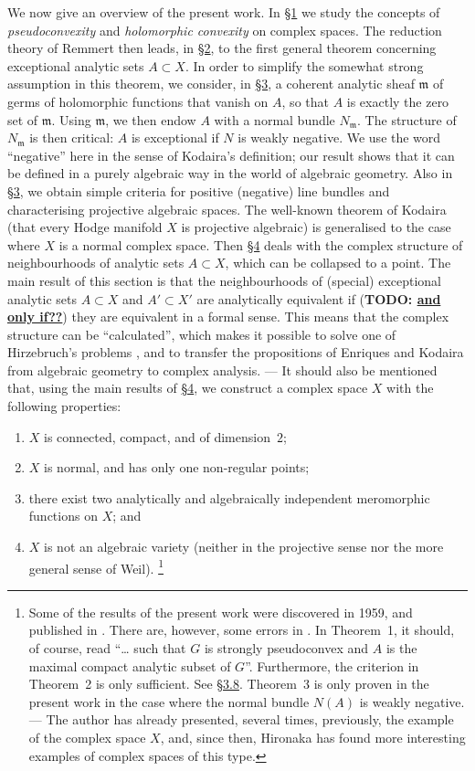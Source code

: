 \documentclass{article}
\theoremstyle{plain}
\theoremstyle{definition}
\newcommand{\fk}{\mathfrak}
\newcommand{\unsure}[1]{\textbf{TODO: \underline{#1}}}
\newcommand{\oldpage}[1]{\marginpar{\footnotesize$\Big\vert$ \textit{p.~#1}}}
\begin{document}
\oldpage{332}
We now give an overview of the present work.
In \hyperref[1]{\S1} we study the concepts of \emph{pseudoconvexity} and \emph{holomorphic convexity} on complex spaces.
The reduction theory of Remmert then leads, in \hyperref[2]{\S2}, to the first general theorem concerning exceptional analytic sets $A\subset X$.
In order to simplify the somewhat strong assumption in this theorem, we consider, in \hyperref[3]{\S3}, a coherent analytic sheaf $\fk{m}$ of germs of holomorphic functions that vanish on $A$, so that $A$ is exactly the zero set of $\fk{m}$.
Using $\fk{m}$, we then endow $A$ with a normal bundle $N_\fk{m}$.
The structure of $N_\fk{m}$ is then critical: $A$ is exceptional if $N$ is weakly negative.
We use the word ``negative'' here in the sense of Kodaira's definition; our result shows that it can be defined in a purely algebraic way in the world of algebraic geometry.
Also in \hyperref[3]{\S3}, we obtain simple criteria for positive (negative) line bundles and characterising projective algebraic spaces.
The well-known theorem of Kodaira (that every Hodge manifold $X$ is projective algebraic) is generalised to the case where $X$ is a normal complex space.
Then \hyperref[4]{\S4} deals with the complex structure of neighbourhoods of analytic sets $A\subset X$, which can be collapsed to a point.
The main result of this section is that the neighbourhoods of (special) exceptional analytic sets $A\subset X$ and $A'\subset X'$ are analytically equivalent if (\unsure{and only if??}) they are equivalent in a formal sense.
This means that the complex structure can be ``calculated'', which makes it possible to solve one of Hirzebruch's problems \cite{11}, and to transfer the propositions of Enriques and Kodaira from algebraic geometry to complex analysis.
--- It should also be mentioned that, using the main results of \hyperref[4]{\S4}, we construct a complex space $X$ with the following properties:
\begin{enumerate}[1)]
  \item $X$ is connected, compact, and of dimension~$2$;
  \item $X$ is normal, and has only one non-regular points;
  \item there exist two analytically and algebraically independent meromorphic functions on $X$; and
  \item $X$ is not an algebraic variety (neither in the projective sense nor the more general sense of Weil).%
  \footnote{
    Some of the results of the present work were discovered in 1959, and published in \cite{7}.
    There are, however, some errors in \cite{7}.
    In Theorem~1, it should, of course, read ``\ldots{} such that $G$ is strongly pseudoconvex and $A$ is the maximal compact analytic subset of $G$''.
    Furthermore, the criterion in Theorem~2 is only sufficient.
    See \hyperref[3.8]{\S3.8}.
    Theorem~3 is only proven in the present work in the case where the normal bundle $N(A)$ is weakly negative.
    --- The author has already presented, several times, previously, the example of the complex space $X$, and, since then, Hironaka has found more interesting examples of complex spaces of this type.
  }
\end{enumerate}
\end{document}
